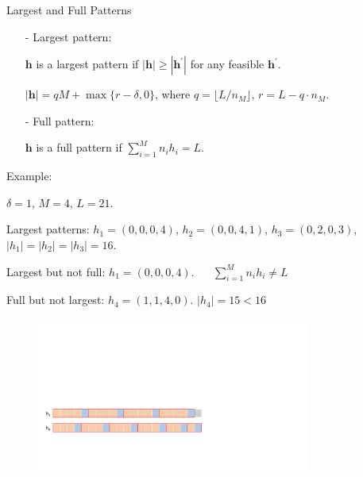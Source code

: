   \begin{frame}{Largest and Full Patterns}
    \begin{itemize} 
      \item[-] {\color{red}Largest} pattern: 
      
      $\bm{h}$ is a largest pattern if $|\bm{h}| \geq |\bm{h}^{\prime}|$ for any feasible $\bm{h}^{\prime}$.
      
      $|\bm{h}| = qM + \max\{r-\delta, 0\}$, where $q = \lfloor L/n_M \rfloor$, $r = L - q \cdot n_M$.
      
      \item[-] {\color{red}Full} pattern: 
      
      $\bm{h}$ is a full pattern if $\sum_{i=1}^{M} n_i h_i = L$.  
    \end{itemize}

     {\color{green} Example}: 
      
      $\delta = 1$, $M =4$, $L = 21$.
      
      Largest patterns: $h_1 = (0, 0, 0, 4)$, $h_2 = (0, 0, 4, 1)$, $h_3 = (0, 2, 0, 3)$, \\ 
                    \hspace{2.7cm}   $|h_1| =|h_2| =|h_3| = 16$.

      Largest but not full: $h_1 = (0, 0, 0, 4)$. {\color{red} $\quad$ $\sum_{i=1}^{M} n_i h_i \neq L$}

      Full but not largest: $h_4 = (1, 1, 4, 0)$. {\color{red} $|h_4| = 15 < 16$}

      \begin{figure}[ht]
        \centering
        \includegraphics[width = 0.8\textwidth]{./images/full_largest.pdf}
      \end{figure}
  \end{frame}




  



